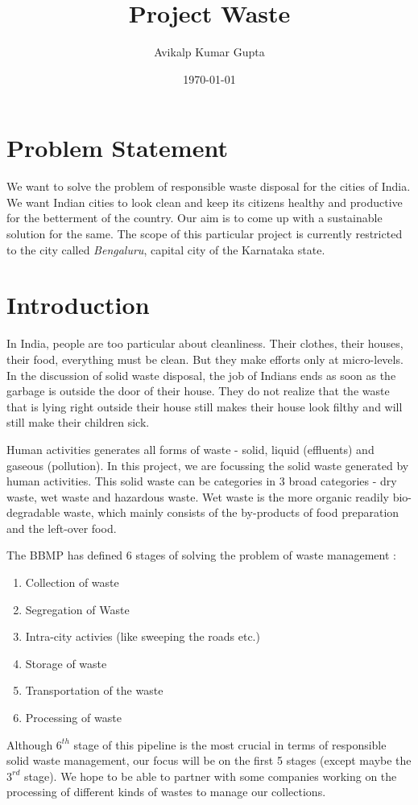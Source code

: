 \documentclass[10pt]{article}
\title{Project Waste}
\author{Avikalp Kumar Gupta}
\date{\today}
\begin{document}
\maketitle

\begin{abstract}



\end{abstract}

\section{Problem Statement}

We want to solve the problem of responsible waste disposal for the cities of India. We want Indian cities to look clean and keep its citizens healthy and productive for the betterment of the country. Our aim is to come up with a sustainable solution for the same. The scope of this particular project is currently restricted to the city called \emph{Bengaluru}, capital city of the Karnataka state. 

\section{Introduction}

In India, people are too particular about cleanliness. Their clothes, their houses, their food, everything must be clean. But they make efforts only at micro-levels. In the discussion of solid waste disposal, the job of Indians ends as soon as the garbage is outside the door of their house. They do not realize that the waste that is lying right outside their house still makes their house look filthy and will still make their children sick. 

Human activities generates all forms of waste - solid, liquid (effluents) and gaseous (pollution). In this project, we are focussing the solid waste generated by human activities. This solid waste can be categories in 3 broad categories - dry waste, wet waste and hazardous waste. Wet waste is the more organic readily bio-degradable waste, which mainly consists of the by-products of food preparation and the left-over food.

The BBMP has defined 6 stages of solving the problem of waste management \citep{BBMP:SWMOverview}:
\begin{enumerate}
	\item Collection of waste
	\item Segregation of Waste
	\item Intra-city activies (like sweeping the roads etc.)
	\item Storage of waste
	\item Transportation of the waste
	\item Processing of waste
\end{enumerate}
Although $6^{th}$ stage of this pipeline is the most crucial in terms of responsible solid waste management, our focus will be on the first 5 stages (except maybe the $3^{rd}$ stage). We hope to be able to partner with some companies working on the processing of different kinds of wastes to manage our collections.
\end{document}
